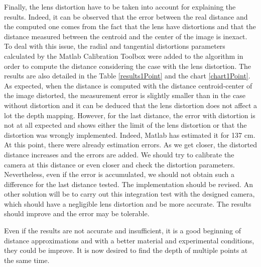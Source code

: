 Finally, the lens distortion have to be taken into account for explaining the results. Indeed, it can be observed that the error between the real distance and the computed one comes from the fact that the lens have distortions and that the distance measured between the centroid and the center of the image is inexact. To deal with this issue, the radial and tangential distortions parameters calculated by the Matlab Calibration Toolbox were added to the algorithm in order to compute the distance considering the case with the lens distortion. The results are also detailed in the Table \ref{results1Point} and the chart \ref{chart1Point}. As expected, when the distance is computed with the distance centroid-center of the image distorted, the measurement error is slightly smaller than in the case without distortion and it can be deduced that the lens distortion does not affect a lot the depth mapping. However, for the last distance, the error with distortion is not at all expected and shows either the limit of the lens distortion or that the distortion was wrongly implemented. Indeed, Matlab has estimated it for 137 cm. At this point, there were already estimation errors. As we get closer, the distorted distance increases and the errors are added. We should try to calibrate the camera at this distance or even closer and check the distortion parameters. Nevertheless, even if the error is accumulated, we should not obtain such a difference for the last distance tested. The implementation should be revised. An other solution will be to carry out this integration test with the designed camera, which should have a negligible lens distortion and be more accurate. The results should improve and the error may be tolerable.

Even if the results are not accurate and insufficient, it is a good beginning of distance approximations and with a better material and experimental conditions, they could be improve. It is now desired to find the depth of multiple points at the same time.